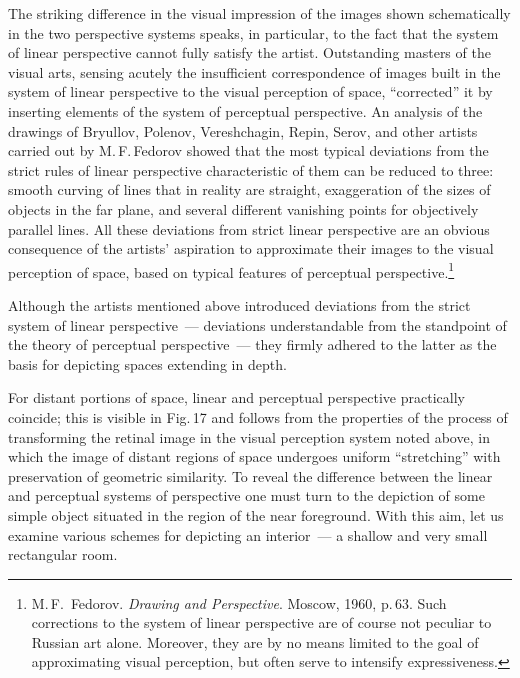The striking difference in the visual impression of the images shown schematically in
the two perspective systems speaks, in particular, to the fact that the system of linear
perspective cannot fully satisfy the artist.  Outstanding masters of the visual arts,
sensing acutely the insufficient correspondence of images built in the system of linear
perspective to the visual perception of space, ``corrected'' it by inserting elements of
the system of perceptual perspective.  An analysis of the drawings of Bryullov, Polenov,
Vereshchagin, Repin, Serov, and other artists carried out by M.\,F.\,Fedorov showed
that the most typical deviations from the strict rules of linear perspective characteristic
of them can be reduced to three: smooth curving of lines that in reality are straight,
exaggeration of the sizes of objects in the far plane, and several different vanishing
points for objectively parallel lines.  All these deviations from strict linear perspective
are an obvious consequence of the artists' aspiration to approximate their images to the
visual perception of space, based on typical features of perceptual perspective.\footnote{%
  M.\,F.~Fedorov. \emph{Drawing and Perspective}. Moscow, 1960, p.\,63.  Such
  corrections to the system of linear perspective are of course not peculiar to Russian
  art alone.  Moreover, they are by no means limited to the goal of approximating visual
  perception, but often serve to intensify expressiveness.}


Although the artists mentioned above introduced deviations from the strict system of
linear perspective~--- deviations understandable from the standpoint of the theory of
perceptual perspective~--- they firmly adhered to the latter as the basis for depicting
spaces extending in depth.

For distant portions of space, linear and perceptual perspective practically coincide;
this is visible in Fig.\,17 and follows from the properties of the process of transforming
the retinal image in the visual perception system noted above, in which the image of
distant regions of space undergoes uniform ``stretching'' with preservation of geometric
similarity.  To reveal the difference between the linear and perceptual systems of
perspective one must turn to the depiction of some simple object situated in the region
of the near foreground.  With this aim, let us examine various schemes for depicting an
interior~--- a shallow and very small rectangular room.


